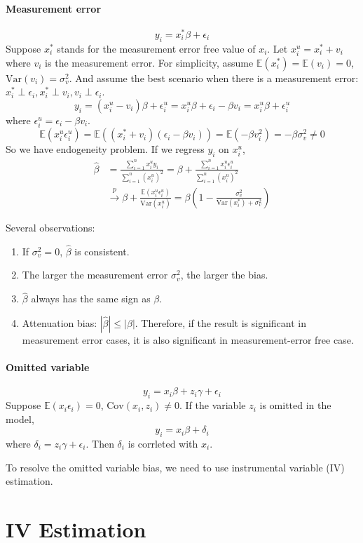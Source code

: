 \documentclass[%
 aip,
 jmp,%
 amsmath,amssymb,
 reprint,%
]{revtex4-1}
\def\b{\beta}
\def\g{\gamma}
\def\d{\delta}
\def\e{\epsilon}
\def\s{\sigma}
\def\E{\mathbb{E}}
\def\Var{\mathrm{Var}}
\def\Cov{\mathrm{Cov}}
\def\pto{\overset{p}{\to}}
\def\h{\hat}
\newcommand{\sumn}[1]{\sum_{i=1}^{n} #1}
\begin{document}
\paragraph{Measurement error}
$$ y_i = x_i^* \b + \e_i $$
Suppose $x_i^*$ stands for the measurement error free value of $x_i$.
Let $x_i^u = x_i^* + v_i$ where $v_i$ is the measurement error.
For simplicity, assume $\E(x_i^*) = \E(v_i) = 0$, $\Var(v_i) = \s_v^2$.
And assume the best scenario when there is a measurement error:
$x_i^* \perp \e_i, x_i^* \perp v_i, v_i \perp \e_i$.
$$ y_i = (x_i^u-v_i) \b + \e_i^u = x_i^u \b + \e_i - \b v_i = x_i^u \b + \e_i^u $$
where $\e_i^u = \e_i - \b v_i$.
$$ \E(x_i^u\e_i^u) = \E((x_i^* + v_i)(\e_i - \b v_i)) = \E(-\b v_i^2) = -\b \s_v^2 \neq 0 $$
So we have endogeneity problem.
If we regress $y_i$ on $x_i^u$,
\begin{align*}
\h\b &= \frac{\sumn x_i^u y_i}{\sumn (x_i^u)^2} = \b + \frac{\sumn x_i^u \e_i^u}{\sumn (x_i^u)^2} \\
& \pto \b + \frac{\E(x_i^u \e_i^u)}{\Var (x_i^u)} = \b\left( 1-\frac{\s_v^2}{\Var (x_i^*) + \s_v^2}\right)
\end{align*}

Several observations:
\begin{enumerate}
  \item If $\s_v^2=0$, $\h\b$ is consistent.
  \item The larger the measurement error $\s_v^2$, the larger the bias.
  \item $\h\b$ always has the same sign as $\b$.
  \item Attenuation bias: $|\h\b| \le |\b|$. Therefore, if the result is
  significant in measurement error cases, it is also significant in
  measurement-error free case.
\end{enumerate}

\paragraph{Omitted variable}
$$ y_i = x_i \b + z_i\g + \e_i $$
Suppose $\E(x_i\e_i) = 0$, $\Cov(x_i, z_i)\neq 0$.
If the variable $z_i$ is omitted in the model,
$$ y_i = x_i \b + \d_i $$
where $\d_i = z_i\g + \e_i$. Then $\d_i$ is corrleted with $x_i$.

To resolve the omitted variable bias, we need to use instrumental variable (IV) estimation.


\section{IV Estimation}
\end{document}

